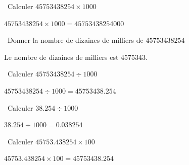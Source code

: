 \begin{questions}
		\question[1]  Calculer $\num{45753438254} \times 1000$
		
		\begin{solution}
			$\num{45753438254} \times 1000 = \num{45753438254000}$
		\end{solution}
		
		\question[1]  Donner la nombre de dizaines de milliers de $\num{45753438254}$
		
		\begin{solution}
			Le nombre de dizaines de milliers est \num{4575343}.
		\end{solution}
		
		\question[1]  Calculer $\num{45753438254} \div 1000$
		
		\begin{solution}
			$\num{45753438254} \div 1000 = \num{45753438.254}$
		\end{solution}
		
		\question[1]  Calculer $\num{38.254} \div 1000$
		
		\begin{solution}
			$\num{38.254} \div 1000 = \num{0.038254}$
		\end{solution}
		
		\question[1]  Calculer $\num{45753.438254} \times 100$
		
		\begin{solution}
			$\num{45753.438254} \times 100 = \num{45753438.254}$
		\end{solution}
	\end{questions}
	
	
